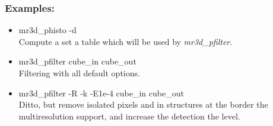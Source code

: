 \noindent

\subsubsection*{Examples:}
\begin{itemize}
\baselineskip=0.4truecm
\itemsep=0.1truecm
\item mr3d\_phisto -d \\
Compute a set a table which will be used by {\em mr3d\_pfilter}.
\item mr3d\_pfilter cube\_in cube\_out \\
Filtering with all default options.
\item mr3d\_pfilter -R -k -E1e-4 cube\_in cube\_out \\
Ditto, but remove isolated pixels and in structures at the border
the multiresolution support, and increase the detection the level.
\end{itemize}
